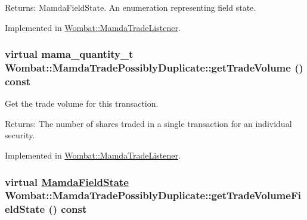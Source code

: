\begin{Desc}
\item[Returns:]Mamda\-Field\-State. An enumeration representing field state. \end{Desc}


Implemented in \hyperlink{classWombat_1_1MamdaTradeListener_f1dc31d1863ca41868f8b4a384c7ac46}{Wombat::Mamda\-Trade\-Listener}.\hypertarget{classWombat_1_1MamdaTradePossiblyDuplicate_f738f7c49a0e026f53dad8e9f2cf4a01}{
\subsubsection[getTradeVolume]{\setlength{\rightskip}{0pt plus 5cm}virtual mama\_\-quantity\_\-t Wombat::Mamda\-Trade\-Possibly\-Duplicate::get\-Trade\-Volume () const}}
\label{classWombat_1_1MamdaTradePossiblyDuplicate_f738f7c49a0e026f53dad8e9f2cf4a01}


Get the trade volume for this transaction. 

\begin{Desc}
\item[Returns:]The number of shares traded in a single transaction for an individual security. \end{Desc}


Implemented in \hyperlink{classWombat_1_1MamdaTradeListener_59830d5b7d9bf0df2e274f8f4ce49cc6}{Wombat::Mamda\-Trade\-Listener}.\hypertarget{classWombat_1_1MamdaTradePossiblyDuplicate_fd783feb0c4a319b6e442613ecdf1c6c}{
\subsubsection[getTradeVolumeFieldState]{\setlength{\rightskip}{0pt plus 5cm}virtual \hyperlink{namespaceWombat_93aac974f2ab713554fd12a1fa3b7d2a}{Mamda\-Field\-State} Wombat::Mamda\-Trade\-Possibly\-Duplicate::get\-Trade\-Volume\-Field\-State () const}}
\label{classWombat_1_1MamdaTradePossiblyDuplicate_fd783feb0c4a319b6e442613ecdf1c6c}


